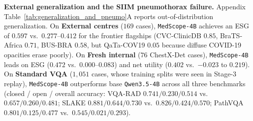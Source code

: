 \documentclass[5p,times,twocolumn,authoryear]{elsarticle}
\begin{document}
\textbf{External generalization and the SIIM pneumothorax failure.} Appendix Table~\ref{tab:generalization_and_pneumo}A reports out-of-distribution generalization. On \textbf{External centres} ($169$ cases), \texttt{MedScope-4B} achieves an ESG of $0.597$ vs.\ $0.277\text{--}0.412$ for the frontier flagships (CVC-ClinicDB $0.85$, BraTS-Africa $0.71$, BUS-BRA $0.58$, but QaTa-COV19 $0.05$ because diffuse COVID-19 opacities erase poorly). On \textbf{Fresh internal} ($76$ ChestX-Det cases), \texttt{MedScope-4B} leads on ESG ($0.472$ vs.\ $0.000\text{--}0.083$) and net utility ($0.402$ vs.\ $-0.023$ to $0.219$). On \textbf{Standard VQA} ($1,051$ cases, whose training splits were seen in Stage-3 replay), \texttt{MedScope-4B} outperforms base \texttt{Qwen3.5-4B} across all three benchmarks (closed / open / overall accuracy: VQA-RAD $0.741 / 0.230 / 0.514$ vs.\ $0.657 / 0.260 / 0.481$; SLAKE $0.881 / 0.644 / 0.730$ vs.\ $0.826 / 0.424 / 0.570$; PathVQA $0.801 / 0.125 / 0.477$ vs.\ $0.545 / 0.021 / 0.293$).
\end{document}
